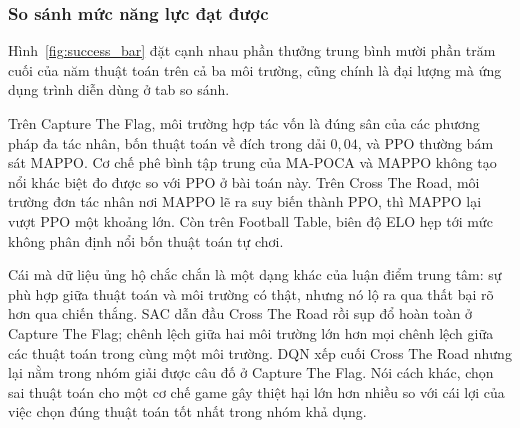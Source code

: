 \subsubsection{So sánh mức năng lực đạt được}
\indent Hình~\ref{fig:success_bar} đặt cạnh nhau phần thưởng trung bình mười phần trăm
cuối của năm thuật toán trên cả ba môi trường, cũng chính là đại lượng mà ứng dụng trình diễn
dùng ở tab so sánh. 

\indent Trên Capture The Flag, môi trường hợp tác vốn là đúng sân của các phương pháp đa tác
nhân, bốn thuật toán về đích trong dải $0{,}04$, và PPO thường bám sát MAPPO. Cơ chế phê
bình tập trung của MA-POCA và MAPPO không tạo nổi khác biệt đo được so với PPO ở bài toán
này. Trên Cross The Road, môi trường đơn tác nhân nơi MAPPO lẽ ra suy biến thành PPO, thì
MAPPO lại vượt PPO một khoảng lớn. Còn trên Football Table, biên độ ELO hẹp tới mức không
phân định nổi bốn thuật toán tự chơi.

\indent Cái mà dữ liệu ủng hộ chắc chắn là một dạng khác của luận điểm trung tâm: sự phù
hợp giữa thuật toán và môi trường có thật, nhưng nó lộ ra qua thất bại rõ hơn qua chiến
thắng. SAC dẫn đầu Cross The Road rồi sụp đổ hoàn toàn ở Capture The Flag; chênh lệch giữa
hai môi trường lớn hơn mọi chênh lệch giữa các thuật toán trong cùng một môi trường. DQN
xếp cuối Cross The Road nhưng lại nằm trong nhóm giải được câu đố ở Capture The Flag. Nói
cách khác, chọn sai thuật toán cho một cơ chế game gây thiệt hại lớn hơn nhiều so với cái
lợi của việc chọn đúng thuật toán tốt nhất trong nhóm khả dụng.

